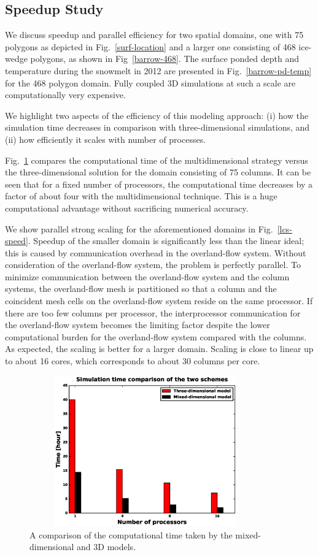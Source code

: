 \documentclass[review]{elsarticle}
\begin{document}
\subsection{Speedup Study}
We discuss speedup and parallel efficiency for two spatial domains, one with 75 polygons as depicted in Fig.~\ref{surf-location} and a larger one consisting of 468 ice-wedge polygons, as shown in Fig~\ref{barrow-468}. The surface ponded depth and temperature during the snowmelt in 2012 are presented in Fig.~\ref{barrow-pd-temp} for the 468 polygon domain. Fully coupled 3D simulations at such a scale are computationally very expensive.

We highlight two aspects of the efficiency of this modeling approach: (i) how the simulation time decreases in comparison with three-dimensional simulations, and (ii) how efficiently it scales with number of processes. 

Fig.~\ref{3d-lcs-speed} compares the computational time of the multidimensional strategy versus the three-dimensional solution for the domain consisting of 75 columns. 
It can be seen that for a fixed number of processors, the computational time decreases by a factor of about four with the multidimensional technique. This is a huge computational advantage without sacrificing numerical accuracy. 

We show parallel strong scaling for the aforementioned domains in Fig.~\ref{lcs-speed}. Speedup of the smaller domain is significantly less than the linear ideal; this is caused by communication overhead in the overland-flow system. Without consideration of the overland-flow system, the problem is perfectly parallel. To minimize communication between the overland-flow system and the column systems, the overland-flow mesh is partitioned so that a column and the coincident mesh cells on the  overland-flow system reside on the same processor. If there are too few columns per processor, the interprocessor communication for the overland-flow system becomes the limiting factor despite the lower computational burden for the overland-flow system compared with the columns. 
As expected, the scaling is better for a larger domain. Scaling is close to linear up to about 16 cores, which corresponds to about 30 columns per core. 

\begin{figure}[!htpb]
\centering
\includegraphics[height = 6.5cm, width=10cm]{figures/compare3d-lcs-speed.eps}
\caption{A comparison of the computational time taken by the mixed-dimensional and 3D models.}
\label{3d-lcs-speed}
\end{figure}
\end{document}
